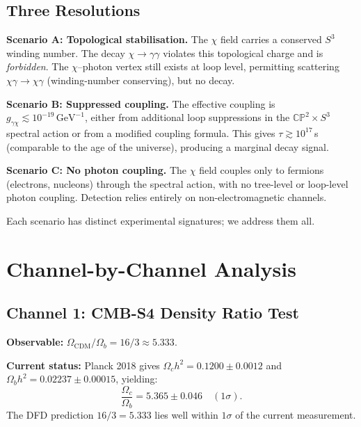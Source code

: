 \documentclass[12pt,a4paper]{article}
\begin{document}
\subsection{Three Resolutions}

\textbf{Scenario A: Topological stabilisation.}
The $\chi$ field carries a conserved $S^3$ winding number. The decay
$\chi \to \gamma\gamma$ violates this topological charge and is
\emph{forbidden}. The $\chi$--photon vertex still exists at loop level,
permitting scattering $\chi\gamma \to \chi\gamma$ (winding-number
conserving), but no decay.

\textbf{Scenario B: Suppressed coupling.}
The effective coupling is $g_{\gamma\chi} \lesssim 10^{-19}\,\mathrm{GeV}^{-1}$,
either from additional loop suppressions in the $\mathbb{CP}^2 \times S^3$
spectral action or from a modified coupling formula. This gives
$\tau \gtrsim 10^{17}$\,s (comparable to the age of the universe),
producing a marginal decay signal.

\textbf{Scenario C: No photon coupling.}
The $\chi$ field couples only to fermions (electrons, nucleons) through
the spectral action, with no tree-level or loop-level photon coupling.
Detection relies entirely on non-electromagnetic channels.

Each scenario has distinct experimental signatures; we address them all.

\section{Channel-by-Channel Analysis}

\subsection{Channel 1: CMB-S4 Density Ratio Test}
\label{sec:cmbs4}

\textbf{Observable:} $\Omega_\mathrm{CDM}/\Omega_b = 16/3 \approx 5.333$.

\textbf{Current status:} Planck 2018 gives
$\Omega_c h^2 = 0.1200 \pm 0.0012$ and $\Omega_b h^2 = 0.02237 \pm 0.00015$,
yielding:
\begin{equation}
\frac{\Omega_c}{\Omega_b} = 5.365 \pm 0.046 \quad (1\sigma).
\end{equation}
The DFD prediction $16/3 = 5.333$ lies well within $1\sigma$ of the
current measurement.
\end{document}
